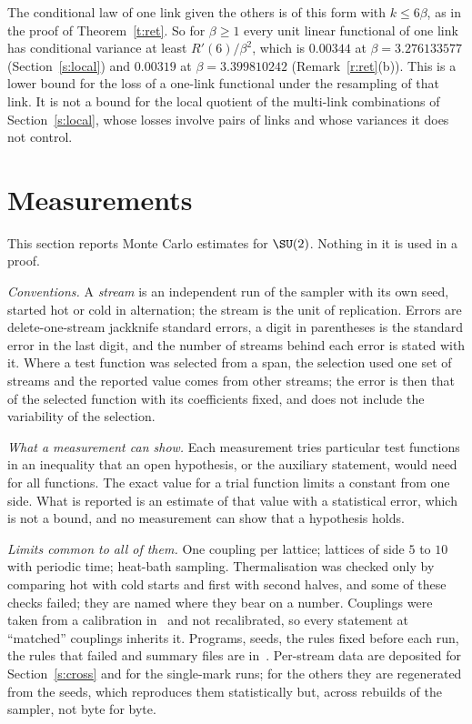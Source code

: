 \begin{remark}\label{r:haar}
The conditional law of one link given the others is of this form with $k\le6\beta$, as in the proof of
Theorem~\ref{t:ret}. So for $\beta\ge1$ every unit linear functional of one link has conditional variance at
least $R'(6)/\beta^2$, which is $0.00344$ at $\beta=3.276133577$ (Section~\ref{s:local}) and $0.00319$ at
$\beta=3.399810242$ (Remark~\ref{r:ret}(b)). This is
a lower bound for the loss of a one-link functional under the resampling of that link. It is not a bound for
the local quotient of the multi-link combinations of Section~\ref{s:local}, whose losses involve pairs of
links and whose variances it does not control.
\end{remark}

\section{Measurements}\label{s:evid}
This section reports Monte Carlo estimates for $\SU(2)$. Nothing in it is used in a proof.

\emph{Conventions.} A \emph{stream} is an independent run of the sampler with its own seed, started hot or
cold in alternation; the stream is the unit of replication. Errors are delete-one-stream jackknife standard
errors, a digit in parentheses is the standard error in the last digit, and the number of streams behind
each error is stated with it. Where a test function was selected from a span, the selection used one set of
streams and the reported value comes from other streams; the error is then that of the selected function with
its coefficients fixed, and does not include the variability of the selection.

\emph{What a measurement can show.} Each measurement tries particular test functions in an inequality that an
open hypothesis, or the auxiliary statement, would need for all functions. The exact value for a trial
function limits a constant from one side. What is reported is an estimate of that value with a statistical
error, which is not a bound, and no measurement can show that a hypothesis holds.

\emph{Limits common to all of them.} One coupling per lattice; lattices of side $5$ to $10$ with periodic
time; heat-bath sampling. Thermalisation was checked only by comparing hot with cold starts and first with
second halves, and some of these checks failed; they are named where they bear on a number. Couplings were
taken from a calibration in~\cite{RepoData} and not recalibrated, so every statement at ``matched'' couplings
inherits it. Programs, seeds, the rules fixed before each run, the rules that failed and summary files are
in~\cite{RepoData}. Per-stream data are deposited for Section~\ref{s:cross} and for the single-mark runs; for
the others they are regenerated from the seeds, which reproduces them statistically but, across rebuilds of
the sampler, not byte for byte.

